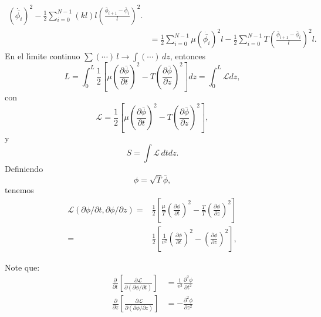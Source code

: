 \begin{frame}
\begin{align}
  \left(
    \dot{\bar{\phi_i}}
  \right)^2-\frac{1}{2}\sum_{i=0}^{N-1}(k l) l
  \left(
\frac{\bar\phi_{i+1}-\bar\phi_{i}}{l}
  \right)^2.\nonumber\\
&=\frac{1}{2}\sum_{i=0}^{N-1}\mu
  \left(
    \dot{\bar{\phi_i}}
  \right)^2l-\frac{1}{2}\sum_{i=0}^{N-1}T
  \left(
\frac{\bar\phi_{i+1}-\bar\phi_{i}}{l}
  \right)^2l.
\label{eq:1strLsumm}
\end{align}
En el l\'\i mite continuo $\sum(\cdots)\,l\to\int(\cdots)\,dz$, entonces 
\begin{equation}
\label{eq:238}
  L=\int_0^L\frac{1}{2}
\left[
  \mu\left(\frac{\partial\bar\phi}{\partial t}\right)^2- T\left(\frac{\partial\bar\phi}{\partial z}\right)^2
\right]dz=\int_0^L\mathcal{L}dz,
\end{equation}
con
\begin{equation}
  \label{eq:call1}
  \mathcal{L}=\frac{1}{2}
\left[
  \mu\left(\frac{\partial\bar\phi}{\partial t}\right)^2- T\left(\frac{\partial\bar\phi}{\partial z}\right)^2
\right],
\end{equation}
y
\begin{equation}
  \label{eq:Scall}
  S=\int\mathcal{L}\,dtdz.
\end{equation}
Definiendo
\begin{equation}
  \label{eq:barff}
  \phi=\sqrt{T}\bar\phi,
\end{equation}
tenemos
\begin{align}
  \label{eq:call2}
  \mathcal{L}(\partial\phi/\partial t,\partial\phi/\partial z)=&
\frac{1}{2}
\left[
  \frac{\mu}{T}\left(\frac{\partial\phi}{\partial t}\right)^2- \frac{T}{T}\left(\frac{\partial\phi}{\partial z}\right)^2
\right]\nonumber\\
=&\frac{1}{2}
\left[
  \frac{1}{v^2}\left(\frac{\partial\phi}{\partial t}\right)^2-\left(\frac{\partial\phi}{\partial z}\right)^2
\right],
\end{align}
\end{frame}
Note que:
\begin{align}
  \label{eq:dcalt}
  \frac{\partial}{\partial t}
  \left[
    \frac{\partial\mathcal{L}}{\partial
      (\partial\phi/\partial t)}
  \right]&=    \frac{1}{v^2}\frac{\partial^2\phi}{\partial t^2}\\
  \label{eq:dcalz} %
  \frac{\partial}{\partial z}
  \left[
    \frac{\partial\mathcal{L}}{\partial
      (\partial\phi/\partial z)}
  \right]&= -\frac{\partial^2\phi}{\partial z^2}
\end{align}


